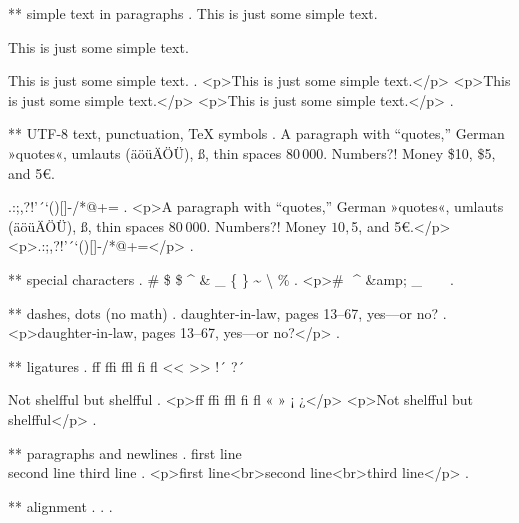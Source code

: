 ** simple text in paragraphs
.
This is just some simple text.

This is just some simple text.

This is just some simple text.
.
<p>This is just some simple text.</p>
<p>This is just some simple text.</p>
<p>This is just some simple text.</p>
.


** UTF-8 text, punctuation, TeX symbols
.
A para\-graph with “quotes,” German »quotes«, umlauts (äöüÄÖÜ), ß, thin spaces 80\,000. Numbers?! Money \$10, \$5, and 5€.

.:;,?!'´`()[]-/*@+=
.
<p>A paragraph with “quotes,” German »quotes«, umlauts (äöüÄÖÜ), ß, thin spaces 80 000. Numbers?! Money $10, $5, and 5€.</p>
<p>.:;,?!'´`()[]‐/*@+=</p>
.


** special characters
.
\# \$ \$ \^{} \& \_ \{ \} \~{} \textbackslash{} \%
.
<p># $ $ ^ &amp; _ { } ~ \ %
.


** dashes, dots (no math)
.
daughter-in-law, pages 13--67, yes---or no?
.
<p>daughter‐in‐law, pages 13–67, yes—or no?</p>
.


** ligatures
.
ff ffi ffl fi fl << >> !´ ?´

Not shelfful but shelf\mbox{}ful
.
<p>ﬀ ﬃ ﬄ ﬁ ﬂ « » ¡ ¿</p>
<p>Not shelﬀul but shelfful</p>
.


** paragraphs and newlines
.
first line\\
second line\newline
third line
.
<p>ﬁrst line<br>second line<br>third line</p>
.


** alignment
.
.
.
